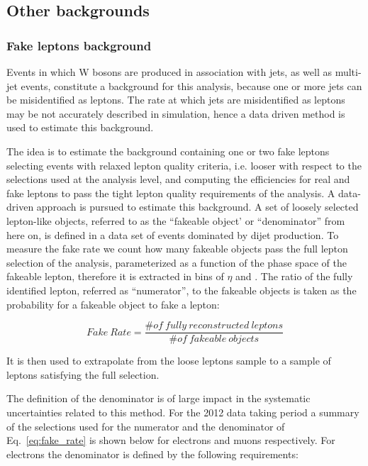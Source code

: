 \subsection{Other backgrounds\label{sec:OtherBackgrounds}}

	\subsubsection{Fake leptons background\label{sec:wjetsbkg}}	
	
Events in which W bosons are produced in association with jets, as well as multi-jet events, constitute a background for this analysis, because one or more jets can be misidentified as leptons. The rate at which jets are misidentified as leptons may be not accurately described in simulation, hence a data driven method is used to estimate this background. 
	
The idea is to estimate the background containing one or two fake leptons selecting events with relaxed lepton quality criteria, i.e. looser with respect to the selections used at the analysis level, and computing the efficiencies for real and fake leptons to pass the tight lepton quality requirements of the analysis. 
A data-driven approach is pursued to estimate this background. A set of loosely selected lepton-like objects, referred to as the ``fakeable object' or ``denominator'' from here on, is defined in a data set of events dominated by dijet production.
To measure the fake rate we count how many fakeable objects pass the full lepton selection 
of the analysis, parameterized as a function of the phase space of the fakeable lepton, therefore 
it is extracted in bins of $\eta$ and \pt.
The ratio of the fully identified lepton, referred as ``numerator'', to the 
fakeable objects is taken as the probability for a fakeable object to fake a lepton:

\begin{equation} \label{eq:fake_rate}
{Fake\ Rate } = \frac{\# of \ fully \ reconstructed \ leptons}{\# of \ fakeable \ objects} 
\end{equation}

It is then used to extrapolate from the loose leptons sample to a sample of leptons satisfying the  
full selection.

The definition of the denominator is of large impact in the systematic uncertainties related to this method. For the 2012 data taking period a summary of the selections used for the numerator and the denominator of Eq.~\eqref{eq:fake_rate} is shown below for electrons and muons respectively.
For electrons the denominator is defined by the following requirements:

